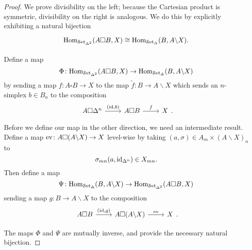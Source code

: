 \documentclass[main.tex]{subfiles}
\begin{document}
\begin{proof}
  We prove divisibility on the left; because the Cartesian product is symmetric, divisibility on the right is analogous. We do this by explicitly exhibiting a natural bijection
  \begin{equation*}
    \begin{tikzcd}
      \Hom_{\SSSet}(A \square B, X) \cong \Hom_{\SSet}(B, A \backslash X).
    \end{tikzcd}
  \end{equation*}

  Define a map
  \begin{equation*}
    \Phi\colon \mathrm{Hom}_{\mathcal{S}\mathrm{et}_{\Delta^{2}}}(A \square B, X) \to \mathrm{Hom}_{\mathcal{S}\mathrm{et}_{\Delta}}(B, A \backslash X)
  \end{equation*}
  by sending a map $f\colon A \square B \to X$ to the map $\tilde{f}\colon B \to A \backslash X$ which sends an $n$-simplex $b \in B_{n}$ to the composition
  \begin{equation*}
    \begin{tikzcd}
      A \square \Delta^{n}
      \arrow[r, "{(\id, b)}"]
      & A \square B
      \arrow[r, "f"]
      & X
    \end{tikzcd}.
  \end{equation*}

  Before we define our map in the other direction, we need an intermediate result. Define a map $\mathrm{ev}\colon A \square (A \backslash X) \to X$ level-wise by taking $(a, \sigma) \in A_{m} \times (A \backslash X)_{n}$ to
  \begin{equation*}
    \sigma_{mn}(a, \mathrm{id}_{\Delta^{n}}) \in X_{mn}.
  \end{equation*}
  Then define a map
  \begin{equation*}
    \Psi\colon \mathrm{Hom}_{\mathcal{S}\mathrm{et}_{\Delta}}(B, A \backslash X) \to \mathrm{Hom}_{\mathcal{S}\mathrm{et}_{\Delta^{2}}}(A \square B, X)
  \end{equation*}
  sending a map $g\colon B \to A \backslash X$ to the composition
  \begin{equation*}
    \begin{tikzcd}
      A \square B
      \arrow[r, "{(\id, g)}"]
      & A \square (A \backslash X)
      \arrow[r, "\ev"]
      & X
    \end{tikzcd}.
  \end{equation*}

  The maps $\Phi$ and $\Psi$ are mutually inverse, and provide the necessary natural bijection.


\end{proof}
\end{document}

